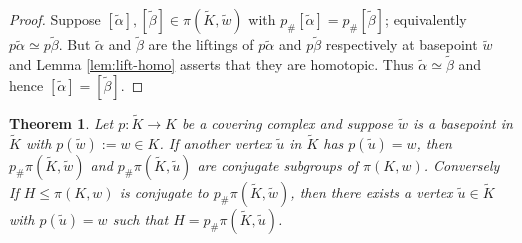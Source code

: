 \documentclass[12pt]{article}
\newtheorem{theorem}{Theorem}
\theoremstyle{definition}
\numberwithin{equation}{theorem}
\begin{document}
\begin{proof}
  Suppose $[\tilde{\alpha}],[\tilde{\beta}] \in \pi(\tilde{K},\tilde{w})$ with $p_{\#}[\tilde{\alpha}] = p_{\#}[\tilde{\beta}]$; equivalently $p\tilde{\alpha} \simeq p\tilde{\beta}$. But $\tilde{\alpha}$ and $\tilde{\beta}$ are the liftings of $p\tilde{\alpha}$ and $p\tilde{\beta}$ respectively at basepoint $\tilde{w}$ and Lemma \ref{lem:lift-homo} asserts that they are homotopic. Thus $\tilde{\alpha} \simeq \tilde{\beta}$ and hence $[\tilde{\alpha}] = [\tilde{\beta}]$.
\end{proof}

\begin{theorem}
  Let $p: \tilde{K} \rightarrow K$ be a covering complex and suppose $\tilde{w}$ is a basepoint in $\tilde{K}$ with $p(\tilde{w}) := w \in K$. If another vertex $\tilde{u}$ in $\tilde{K}$ has $p(\tilde{u}) = w$, then $p_{\#}\pi(\tilde{K},\tilde{w})$ and $p_{\#}\pi(\tilde{K},\tilde{u})$ are conjugate subgroups of $\pi(K,w)$. Conversely If $H \leq \pi(K,w)$ is conjugate to $p_{\#}\pi(\tilde{K},\tilde{w})$, then there exists a vertex $\tilde{u} \in \tilde{K}$ with $p(\tilde{u}) = w$ such that $H = p_{\#}\pi(\tilde{K},\tilde{u})$.
\end{theorem}
\end{document}
